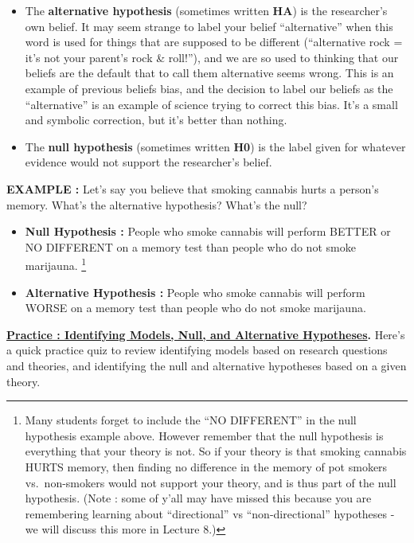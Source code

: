 \documentclass[
  letterpaper,
  DIV=11,
  numbers=noendperiod,
  oneside]{scrreprt}
\begin{document}
\begin{itemize}
\item
  The \textbf{alternative hypothesis} (sometimes written \textbf{HA}) is
  the researcher's own belief. It may seem strange to label your belief
  ``alternative'' when this word is used for things that are supposed to
  be different (``alternative rock = it's not your parent's rock \&
  roll!''), and we are so used to thinking that our beliefs are the
  default that to call them alternative seems wrong. This is an example
  of previous beliefs bias, and the decision to label our beliefs as the
  ``alternative'' is an example of science trying to correct this bias.
  It's a small and symbolic correction, but it's better than nothing.
\item
  The \textbf{null hypothesis} (sometimes written \textbf{H0}) is the
  label given for whatever evidence would not support the researcher's
  belief.
\end{itemize}

\textbf{EXAMPLE :} Let's say you believe that smoking cannabis hurts a
person's memory. What's the alternative hypothesis? What's the null?

\begin{itemize}
\item
  \textbf{Null Hypothesis :} People who smoke cannabis will perform
  BETTER or NO DIFFERENT on a memory test than people who do not smoke
  marijauna. \footnote{Many students forget to include the ``NO
    DIFFERENT'' in the null hypothesis example above. However remember
    that the null hypothesis is everything that your theory is not. So
    if your theory is that smoking cannabis HURTS memory, then finding
    no difference in the memory of pot smokers vs.~non-smokers would not
    support your theory, and is thus part of the null hypothesis. (Note
    : some of y'all may have missed this because you are remembering
    learning about ``directional'' vs ``non-directional'' hypotheses -
    we will discuss this more in Lecture 8.)}
\item
  \textbf{Alternative Hypothesis :} People who smoke cannabis will
  perform WORSE on a memory test than people who do not smoke marijauna.
\end{itemize}

\href{https://docs.google.com/forms/d/e/1FAIpQLSdPgseWI3odCwC34jvRZGe0H4oz0Et4HwG8xTig5YFtDU_ldw/viewform?usp=header}{\textbf{Practice
: Identifying Models, Null, and Alternative Hypotheses}}\textbf{.}
Here's a quick practice quiz to review identifying models based on
research questions and theories, and identifying the null and
alternative hypotheses based on a given theory.
\end{document}
